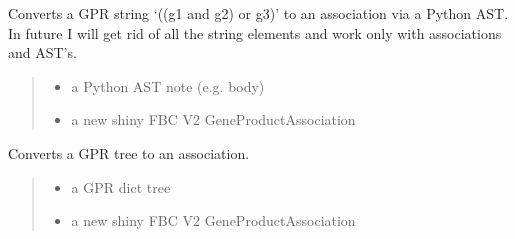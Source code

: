 \documentclass[letterpaper,12pt,english]{sphinxmanual}
\begin{document}
\begin{fulllineitems}
\label{\detokenize{api/io:cbmpy.CBXML.sbml_createAssociationFromAST}}
\pysigstartsignatures
\pysiglinewithargsret
{}
{\sphinxparamcomma {}}
{}
\pysigstopsignatures
\sphinxAtStartPar
Converts a GPR string ‘((g1 and g2) or g3)’ to an association via a Python AST. In future I will get rid of all the string elements and work only with associations and AST’s.
\begin{quote}\begin{description}
\begin{itemize}
\item {} 
\sphinxAtStartPar
{} \textendash{} a Python AST note (e.g. body)

\item {} 
\sphinxAtStartPar
{} \textendash{} a new shiny FBC V2 GeneProductAssociation

\end{itemize}

\end{description}\end{quote}

\end{fulllineitems}


\begin{fulllineitems}
\label{\detokenize{api/io:cbmpy.CBXML.sbml_createAssociationFromTreeV2}}
\pysigstartsignatures
\pysiglinewithargsret
{}
{\sphinxparamcomma {}}
{}
\pysigstopsignatures
\sphinxAtStartPar
Converts a GPR tree to an association.
\begin{quote}\begin{description}
\begin{itemize}
\item {} 
\sphinxAtStartPar
{} \textendash{} a GPR dict tree

\item {} 
\sphinxAtStartPar
{} \textendash{} a new shiny FBC V2 GeneProductAssociation

\end{itemize}

\end{description}\end{quote}

\end{fulllineitems}
\end{document}
